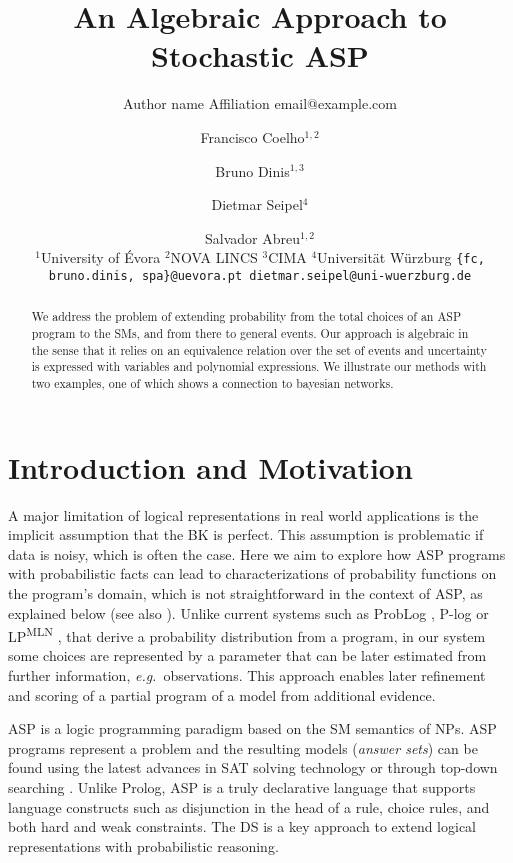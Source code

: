 \documentclass{article}
\title{%
  An Algebraic Approach to Stochastic ASP}
\author{%
	Author name
	\affiliations
	Affiliation
	\emails
	email@example.com    %
}
\author{%
Francisco Coelho$^{1,2}$\and
Bruno Dinis$^{1,3}$\and
Dietmar Seipel$^4$\and
Salvador Abreu$^{1,2}$\\
\affiliations
$^1$University of Évora\quad
$^2$NOVA LINCS\quad
$^3$CIMA\quad
$^4$Universit\"at W\"urzburg
\emails
\texttt{\{fc, bruno.dinis, spa\}@uevora.pt dietmar.seipel@uni-wuerzburg.de}
}
\newcommand{\spa}[1]{{\color{brown!80!black}{#1}}}
\newcounter{remark}
\newcommand{\note}[1]{
	\stepcounter{remark}%
	{\!\!\color{red}/}\footnotemark[\arabic{remark}]\!\!%
	\footnotetext[\arabic{remark}]{{\color{red}/}#1}
}
\begin{document}
\maketitle

\begin{abstract}
  We address the problem of extending probability from the total
  choices of an \acs{ASP} program to the \aclp{SM}, and from there to
  general events. %
  \spa{lengthen abstract}
  Our approach is algebraic in the sense that it relies on an
  equivalence relation over the set of events and uncertainty is
  expressed with variables and polynomial expressions.
  We illustrate our methods with two examples, one of which shows a
  connection to bayesian networks.
\end{abstract}
%
%
%
%
\section{Introduction and Motivation}
%
%
%
A major limitation of logical representations in real world
applications is the implicit assumption that the \acl{BK} is perfect.
This assumption is problematic if data is noisy, which is often the
case.  Here we aim to explore how \acl{ASP} programs with
probabilistic facts can lead to characterizations of probability
functions on the program's domain, which is not straightforward in the
context of \acl{ASP}, as explained below (see also
\cite{verreet2022inference,pajunen2021solution,cozman2020joy,baral2009probabilistic}).
Unlike current systems such as ProbLog \cite{de2007problog}, P-log
\cite{baral2009probabilistic} or LP\textsuperscript{MLN}
\cite{lee2016weighted}, that derive a probability distribution from a
program, in our system some choices are represented by a parameter
that can be later estimated from further information, \emph{e.g.}\
observations.  This approach enables later refinement and scoring of a
partial program of a model from additional evidence.

\Ac{ASP} \cite{lifschitz2002answer,lifschitz2008twelve} is a logic
programming paradigm based on the \ac{SM} semantics of \acp{NP}.
\Ac{ASP} programs represent a problem and the resulting models
(\emph{answer sets}) can be found using the latest advances in SAT
solving technology
\cite{gebser2011potassco,adrian2018asp,niemela1997smodels} or through
top-down searching
\cite{alberti2017cplint,arias2020justifications,marple2017computing}.
Unlike Prolog, \ac{ASP} is a truly declarative language that supports
language constructs such as disjunction in the head of a rule, choice
rules, and both hard and weak constraints.
%
%
The \ac{DS} \cite{sato1995statistical,riguzzi2022foundations} is a key
approach to extend logical representations with probabilistic
reasoning.
\end{document}

